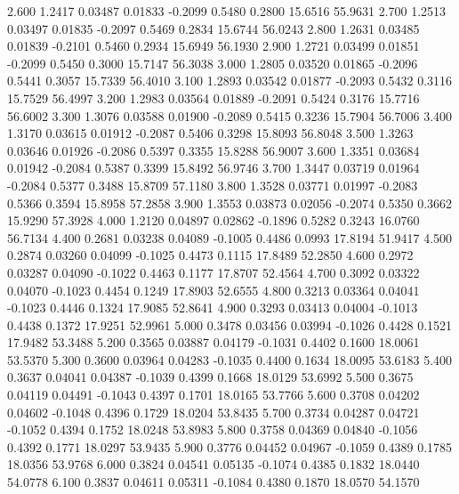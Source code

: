    2.600   1.2417   0.03487   0.01833  -0.2099   0.5480   0.2800  15.6516  55.9631
   2.700   1.2513   0.03497   0.01835  -0.2097   0.5469   0.2834  15.6744  56.0243
   2.800   1.2631   0.03485   0.01839  -0.2101   0.5460   0.2934  15.6949  56.1930
   2.900   1.2721   0.03499   0.01851  -0.2099   0.5450   0.3000  15.7147  56.3038
   3.000   1.2805   0.03520   0.01865  -0.2096   0.5441   0.3057  15.7339  56.4010
   3.100   1.2893   0.03542   0.01877  -0.2093   0.5432   0.3116  15.7529  56.4997
   3.200   1.2983   0.03564   0.01889  -0.2091   0.5424   0.3176  15.7716  56.6002
   3.300   1.3076   0.03588   0.01900  -0.2089   0.5415   0.3236  15.7904  56.7006
   3.400   1.3170   0.03615   0.01912  -0.2087   0.5406   0.3298  15.8093  56.8048
   3.500   1.3263   0.03646   0.01926  -0.2086   0.5397   0.3355  15.8288  56.9007
   3.600   1.3351   0.03684   0.01942  -0.2084   0.5387   0.3399  15.8492  56.9746
   3.700   1.3447   0.03719   0.01964  -0.2084   0.5377   0.3488  15.8709  57.1180
   3.800   1.3528   0.03771   0.01997  -0.2083   0.5366   0.3594  15.8958  57.2858
   3.900   1.3553   0.03873   0.02056  -0.2074   0.5350   0.3662  15.9290  57.3928
   4.000   1.2120   0.04897   0.02862  -0.1896   0.5282   0.3243  16.0760  56.7134
   4.400   0.2681   0.03238   0.04089  -0.1005   0.4486   0.0993  17.8194  51.9417
   4.500   0.2874   0.03260   0.04099  -0.1025   0.4473   0.1115  17.8489  52.2850
   4.600   0.2972   0.03287   0.04090  -0.1022   0.4463   0.1177  17.8707  52.4564
   4.700   0.3092   0.03322   0.04070  -0.1023   0.4454   0.1249  17.8903  52.6555
   4.800   0.3213   0.03364   0.04041  -0.1023   0.4446   0.1324  17.9085  52.8641
   4.900   0.3293   0.03413   0.04004  -0.1013   0.4438   0.1372  17.9251  52.9961
   5.000   0.3478   0.03456   0.03994  -0.1026   0.4428   0.1521  17.9482  53.3488
   5.200   0.3565   0.03887   0.04179  -0.1031   0.4402   0.1600  18.0061  53.5370
   5.300   0.3600   0.03964   0.04283  -0.1035   0.4400   0.1634  18.0095  53.6183
   5.400   0.3637   0.04041   0.04387  -0.1039   0.4399   0.1668  18.0129  53.6992
   5.500   0.3675   0.04119   0.04491  -0.1043   0.4397   0.1701  18.0165  53.7766
   5.600   0.3708   0.04202   0.04602  -0.1048   0.4396   0.1729  18.0204  53.8435
   5.700   0.3734   0.04287   0.04721  -0.1052   0.4394   0.1752  18.0248  53.8983
   5.800   0.3758   0.04369   0.04840  -0.1056   0.4392   0.1771  18.0297  53.9435
   5.900   0.3776   0.04452   0.04967  -0.1059   0.4389   0.1785  18.0356  53.9768
   6.000   0.3824   0.04541   0.05135  -0.1074   0.4385   0.1832  18.0440  54.0778
   6.100   0.3837   0.04611   0.05311  -0.1084   0.4380   0.1870  18.0570  54.1570

